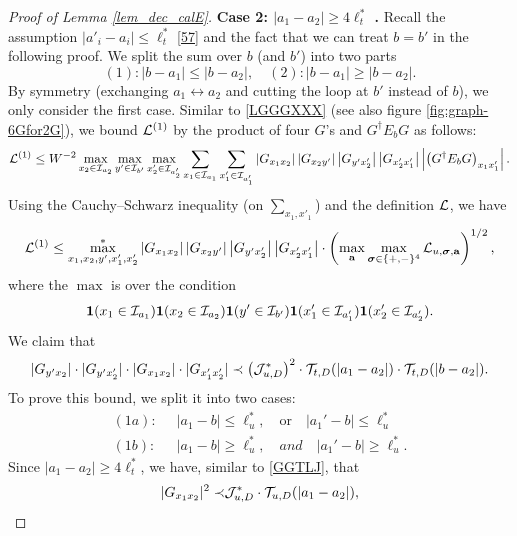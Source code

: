 \documentclass[10pt,reqno]{article}
\theoremstyle{plain} %
\theoremstyle{remark}
\numberwithin{equation}{section}
\begin{document}
\begin{proof}[Proof of Lemma \ref{lem_dec_calE}]
 \noindent 
{\bf Case 2: $|a_1-a_2|\ge 4\ell_t^*$ .} 
Recall  the assumption  $|a'_i-a_i|\le \ell_t^*$ \eqref{57} and the fact  that we can treat $b=b'$  in the following proof.  
We  split the sum over $b$ (and $b'$) into two parts 
$$
(1): |b -a_1|\le |b-a_2|,\quad (2): |b-a_1|\ge |b-a_2|.
$$
By symmetry (exchanging $a_1\leftrightarrow a_2$ and cutting the loop at $b'$ instead of $b$), we only consider  the first case.   Similar to \eqref{LGGGXXX} (see also figure \ref{fig:graph-6Gfor2G}), we  bound ${\cal L}^{(1)}$ by the product of four $G$'s and  $G^\dagger E_b G$ as follows: 
\begin{align} 
{\cal L}^{(1)}\le W^{-2}   \max_{ x_2\in {\cal I}_{a _2}}\max_{ y'\in {\cal I}_{b'}}\max_{x_2'\in {\cal I}_{a'_2}} \sum_{x_1\in {\cal I}_{a_1}}\sum_{x'_1\in {\cal I}_{a'_1}}
\left|G_{x_1x_2}\right|
\left|G_{x_2y'}\right|
\left|G_{y'x_2'}\right|
\left|G_{ x_2'x_1'}\right|
\left|\left(G^\dagger E_b G\right)_{ x_1x_1'}\right|.
\end{align}
Using the Cauchy--Schwarz inequality (on $\sum_{x_1,x'_1}$) and the definition $\cal L$, we have
\begin{align}\label{L6G6X}
{\cal L}^{(1)}\le \max^*_{x_1,x_2,y',x_1',x_2'}  
\left|G_{x_1x_2}\right|
\left|G_{x_2y'}\right|
\left|G_{y'x_2'}\right|
\left|G_{ x_2'x_1'}\right|
\cdot \left(\max_{ \textbf{a}}\max_{\boldsymbol{\sigma}\in \{+,-\}^4 }{\cal L}_{u,\boldsymbol{\sigma},\textbf{a}}\right)^{1/2}, 
\end{align}
where the $\max $ is over  the condition 
$$
 {\bf 1}(x_1\in {\cal I}_{a_1}){\bf 1}(x_2\in {\cal I}_{a_2}){\bf 1}(y'\in {\cal I}_{b'}){\bf 1}(x'_1\in {\cal I}_{a'_1}){\bf 1}(x'_2\in {\cal I}_{a'_2}).
$$
We claim that 
\begin{align} \label{GGTLJ4G}
|G_{y'x_2}|\cdot |G_{y'x_2'}| 
\cdot 
|G_{x_1x_2}|\cdot |G_{x_1'x_2'}|
\prec 
\left({\cal J}^*_{u,D}\right)^2\cdot 
{\cal T} _{t,D}(|a_1-a_2|)\cdot {\cal T} _{t,D}( |b-a_2|)  .  
\end{align}
To prove this bound, we split it into two cases:  
\begin{align}
(1a): \;&\; |a_1-b|\le \ell_u^*,\quad \text{or}\quad |a_1'-b|\le \ell_u^*\nonumber \\
(1b):   \;&\;  |a_1-b|\ge \ell_u^*,\quad and\quad |a_1'-b|\ge \ell_u^*.
\end{align} 
Since $|a_1-a_2|\ge 4\ell_t^*$, we have,  similar to \eqref{GGTLJ}, that 
\begin{align} 
 |G_{x_1x_2}|^2\prec  & {\cal J}^*_{u,D}\cdot {\cal T}_{u,D}(|a_1-a_2|), \\

\end{align}
\end{proof}
\end{document}
